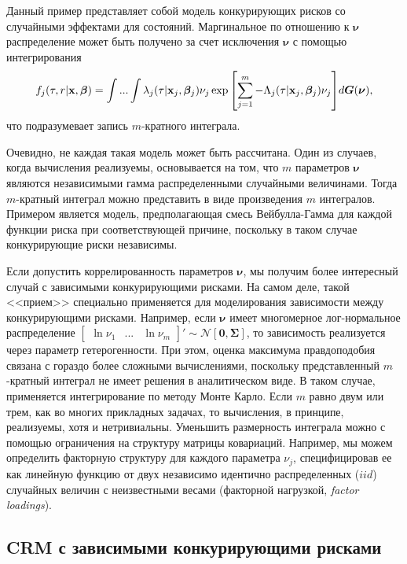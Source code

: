 Данный пример представляет собой модель конкурирующих рисков со случайными эффектами для состояний. Маргинальное по отношению к $\bm{\nu}$ распределение может быть получено за счет исключения $\bm{\nu}$ с помощью интегрирования
    $$f_j(\tau,r|\mathbf{x},\bm{\beta}) = \int ... \int \lambda_j(\tau|\mathbf{x}_j,\bm{\beta}_j)\nu_j \exp{\left[ \sum^{m}_{j=1} -\Lambda_j(\tau|\mathbf{x}_j,\bm{\beta}_j)\nu_j \right]} d\bm{G}(\bm{\nu}),$$
что подразумевает запись $m$-кратного интеграла.

Очевидно, не каждая такая модель может быть рассчитана. Один из случаев, когда вычисления реализуемы, основывается на том, что $m$ параметров $\bm{\nu}$ являются независимыми гамма распределенными случайными величинами. Тогда $m$-кратный интеграл можно представить в виде произведения $m$ интегралов. Примером является модель, предполагающая смесь Вейбулла-Гамма для каждой функции риска при соответствующей причине, поскольку в таком случае конкурирующие риски независимы.

Если допустить коррелированность параметров $\bm{\nu}$, мы получим более интересный случай с зависимыми конкурирующими рисками. На самом деле, такой <<прием>> специально применяется для моделирования зависимости между конкурирующими рисками. Например, если $\bm{\nu}$ имеет многомерное лог-нормальное распределение $\begin{bmatrix} \ln\nu_1 & ... & \ln\nu_m \end{bmatrix}' \sim \mathcal{N}[\bm{0}, \bm{\Sigma}]$, то зависимость реализуется через параметр гетерогенности. При этом, оценка максимума правдоподобия связана с гораздо более сложными вычислениями, поскольку представленный $m$-кратный интеграл не имеет решения в аналитическом виде. В таком случае, применяется интегрирование по методу Монте Карло. Если $m$ равно двум или трем, как во многих прикладных задачах, то вычисления, в принципе, реализуемы, хотя и нетривиальны. Уменьшить размерность интеграла можно с помощью ограничения на структуру матрицы ковариаций. Например, мы можем определить факторную структуру для каждого параметра $\nu_j$, специфицировав ее как линейную функцию от двух независимо идентично распределенных ($iid$) случайных величин с неизвестными весами (факторной нагрузкой, \textit{factor loadings}).


\subsection{CRM с зависимыми конкурирующими рисками}\label{sec:19.2.6}

